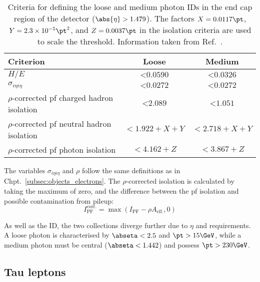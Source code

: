 \begin{table}[htbp]
    \centering
    \begin{tabular}{lcc}
        \toprule
        Criterion & Loose & Medium \\\midrule
        $H/E$ & $< \text{0.0590}$ & $< \text{0.0326}$ \\
        $\sigma_{i\eta i\eta}$ & $< \text{0.0272}$ & $< \text{0.0272}$ \\
        $\rho$-corrected \acrshort{pf} charged hadron isolation & $< \text{2.089}$ & $< \text{1.051}$ \\
        $\rho$-corrected \acrshort{pf} neutral hadron isolation & $< \text{1.922} + X + Y$ & $< \text{2.718} + X + Y$ \\
        $\rho$-corrected \acrshort{pf} photon isolation & $< \text{4.162} + Z$ & $< \text{3.867} + Z$ \\
        \bottomrule
    \end{tabular}
    \caption[Criteria for defining the loose and medium photon IDs in the end cap region of the detector ($\abs{\eta} > \text{1.479}$)]{Criteria for defining the loose and medium photon IDs in the end cap region of the detector ($\abs{\eta} > \text{1.479}$). The factors $X = \text{0.0117}\pt$, $Y = \text{2.3} \times \text{10}^{-5}\pt^2$, and $Z = \text{0.0037}\pt$ in the isolation criteria are used to scale the threshold. Information taken from Ref.~.}
    \label{tab:htoinv_photon_ID_endcap}
\end{table}

The variables $\sigma_{i\eta i\eta}$ and $\rho$ follow the same definitions as in Chpt.~\ref{subsec:objects_electrons}. The $\rho$-corrected isolation is calculated by taking the maximum of zero, and the difference between the \acrlong{pf} isolation and possible contamination from pileup:
\begin{equation}
I_{\mathrm{PF}}^{\mathrm{corr.}} = \max (I_{\mathrm{PF}} - \rho A_{\mathrm{eff.}}, \text{0})
\end{equation}

As well as the ID, the two collections diverge further due to $\eta$ and \pt requirements. A loose photon is characterised by $\abseta < \text{2.5}$ and $\pt > \text{15}\GeV$, while a medium photon must be central ($\abseta < \text{1.442}$) and possess $\pt > \text{230}\GeV$.




\subsection{Tau leptons}
\label{subsec:objects_taus}

